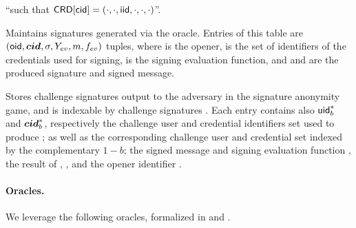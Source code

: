 \begin{description}
  ``\iid such that $\mathsf{CRD}[\mathsf{cid}] = (\cdot,\cdot,\mathsf{iid},\cdot,\cdot,\cdot)$''.
\item[\SIG.] Maintains signatures generated via the \SIGN oracle. Entries of
  this table are $(\mathsf{oid},\boldsymbol{cid},\sigma,Y_{ev},m,f_{ev})$ tuples, where \oid is
  the opener, \scid is the set of identifiers of the credentials used for
  signing, \feval is the signing evaluation function, and \sig and \msg are the
  produced signature and signed message.
\item[\CSIG.] Stores challenge signatures output to the adversary in the
  signature anonymity game, and is indexable by challenge signatures \csig.
  Each entry contains also $\mathsf{uid}^*_b$ and $\boldsymbol{cid}^*_b$, respectively the challenge
  user  and credential identifiers set used to produce \csig; as well as the
  corresponding challenge user and credential set indexed by the complementary
  $1-b$; the signed message \msg and signing evaluation function \feval, the
  result of \feval, \Yeval, and the opener identifier \oid.
\end{description}

\paragraph{Oracles.} %
We leverage the following oracles, formalized in  and
.

